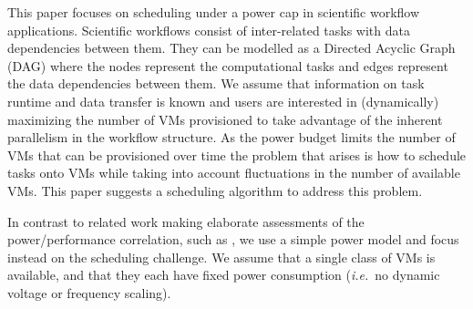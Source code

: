 \documentclass[10pt, conference, compsocconf]{IEEEtran} %
\newcommand{\ie}{\textit{i.e.}\ }
\begin{document}

This paper focuses on scheduling under a power cap in scientific workflow applications.
Scientific workflows \cite{deelmanbook} consist of inter-related tasks with data dependencies between them.
They can be modelled as a Directed Acyclic Graph (DAG) where the nodes represent the computational tasks and edges represent the data dependencies between them.
We assume that information on task runtime and data transfer is known and users are interested in (dynamically) maximizing the number of VMs provisioned to take advantage of the inherent parallelism in the workflow structure.
As the power budget limits the number of VMs that can be provisioned over time the problem that arises is how to schedule tasks onto VMs while taking into account fluctuations in the number of available VMs.
This paper suggests a scheduling algorithm to address this problem.

In contrast to related work making elaborate assessments of the power/performance correlation, such as \cite{bailey2014adaptive}, we use a simple power model and focus instead on the scheduling challenge.
We assume that a single class of VMs is available, and that they each have fixed power consumption (\ie no dynamic voltage or frequency scaling).
\end{document}
